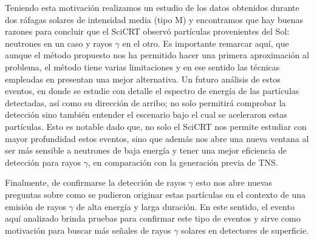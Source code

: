 Teniendo esta motivación realizamos un estudio de los datos obtenidos durante dos ráfagas solares de intensidad media (tipo M) y encontramos que hay buenas razones para concluir que el SciCRT observó partículas provenientes del Sol: neutrones en un caso y rayos $\gamma$ en el otro. Es importante remarcar aquí, que aunque el método propuesto nos ha permitido hacer una primera aproximación al problema, el método tiene varias limitaciones y en ese sentido las técnicas empleadas en \cite{garcia20} presentan una mejor alternativa. Un futuro análisis de estos eventos, en donde se estudie con detalle el espectro de energía de las partículas detectadas, así como su dirección de arribo; no solo permitirá comprobar la detección sino también entender el escenario bajo el cual se aceleraron estas partículas. Esto es notable dado que, no solo el SciCRT nos permite estudiar con mayor profundidad estos eventos, sino que además nos abre una nueva ventana al ser más sensible a neutrones de baja energía y tener una mejor eficiencia de detección para rayos $\gamma$, en comparación con la generación previa de TNS.

Finalmente, de confirmarse la detección de rayos $\gamma$ esto nos abre nuevas preguntas sobre como se pudieron originar estas partículas en el contexto de una emisión de rayos $\gamma$ de alta energía y larga duración. En este sentido, el evento aquí analizado brinda pruebas para confirmar este tipo de eventos y sirve como motivación para buscar más señales de rayos $\gamma$ solares en detectores de superficie.
